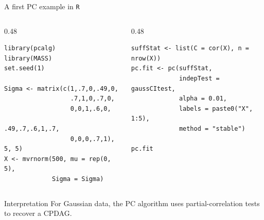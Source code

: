 \documentclass[dvipsnames,aspectratio=169,handout]{beamer}
\begin{document}
\begin{frame}[fragile]{A first PC example in \texttt{R}}
\begin{columns}[T,onlytextwidth]
\begin{column}{0.48\textwidth}
\begin{lstlisting}
library(pcalg)
library(MASS)
set.seed(1)

Sigma <- matrix(c(1,.7,0,.49,0,
                  .7,1,0,.7,0,
                  0,0,1,.6,0,
                  .49,.7,.6,1,.7,
                  0,0,0,.7,1), 5, 5)
X <- mvrnorm(500, mu = rep(0, 5),
             Sigma = Sigma)
\end{lstlisting}
\end{column}
\begin{column}{0.48\textwidth}
\begin{lstlisting}
suffStat <- list(C = cor(X), n = nrow(X))
pc.fit <- pc(suffStat,
             indepTest = gaussCItest,
             alpha = 0.01,
             labels = paste0("X", 1:5),
             method = "stable")

pc.fit
\end{lstlisting}
\end{column}
\end{columns}

\begin{alertblock}{Interpretation}
For Gaussian data, the PC algorithm uses partial-correlation tests to recover a CPDAG.
\end{alertblock}
\end{frame}
\end{document}
